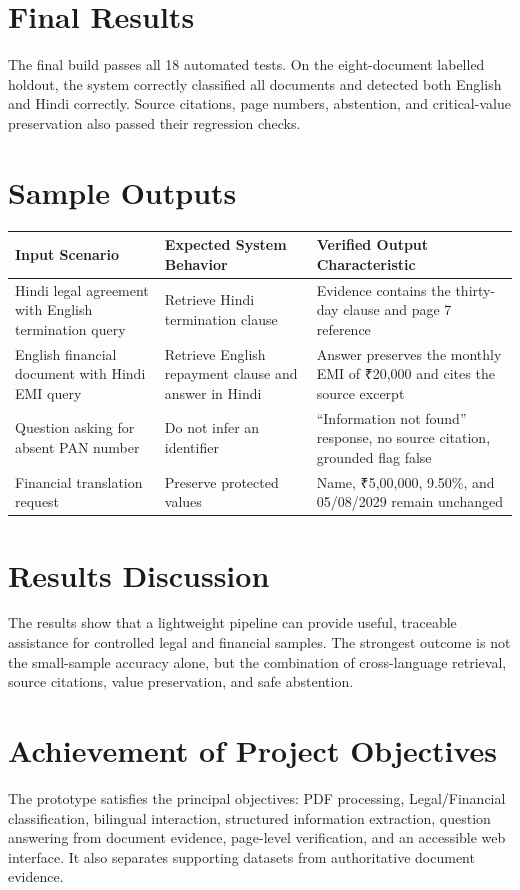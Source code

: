 \section{Final Results}
The final build passes all 18 automated tests. On the eight-document labelled holdout, the system correctly classified all documents and detected both English and Hindi correctly. Source citations, page numbers, abstention, and critical-value preservation also passed their regression checks.

\section{Sample Outputs}
\begin{longtable}{|p{3.4cm}|p{4.3cm}|p{5.7cm}|}
\hline
\textbf{Input Scenario} & \textbf{Expected System Behavior} & \textbf{Verified Output Characteristic} \\
\hline
Hindi legal agreement with English termination query & Retrieve Hindi termination clause & Evidence contains the thirty-day clause and page 7 reference \\
\hline
English financial document with Hindi EMI query & Retrieve English repayment clause and answer in Hindi & Answer preserves the monthly EMI of ₹20,000 and cites the source excerpt \\
\hline
Question asking for absent PAN number & Do not infer an identifier & ``Information not found'' response, no source citation, grounded flag false \\
\hline
Financial translation request & Preserve protected values & Name, ₹5,00,000, 9.50\%, and 05/08/2029 remain unchanged \\
\hline
\end{longtable}

\section{Results Discussion}
The results show that a lightweight pipeline can provide useful, traceable assistance for controlled legal and financial samples. The strongest outcome is not the small-sample accuracy alone, but the combination of cross-language retrieval, source citations, value preservation, and safe abstention.

\section{Achievement of Project Objectives}
The prototype satisfies the principal objectives: PDF processing, Legal/Financial classification, bilingual interaction, structured information extraction, question answering from document evidence, page-level verification, and an accessible web interface. It also separates supporting datasets from authoritative document evidence.


